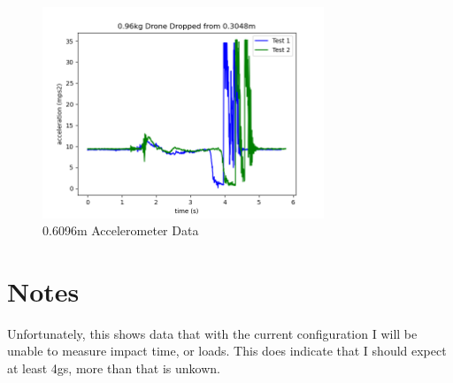 \documentclass[12pt,letterpaper]{article}
\begin{document}
\begin{figure}[h]
\centering
\includegraphics[width = 0.75\textwidth]{Impact_Fig/2ft.png}
\caption{0.6096m Accelerometer Data}
\end{figure}

\section{Notes}


Unfortunately, this shows data that with the current configuration I will be unable to measure impact time, or loads. This does indicate that I should expect at least 4gs, more than that is unkown.
\end{document}
